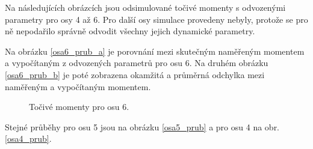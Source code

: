 Na následujících obrázcích jsou odsimulované točivé momenty s odvozenými parametry pro osy 4 až 6. Pro další osy simulace provedeny nebyly, protože se pro ně nepodařilo správně odvodit všechny jejich dynamické parametry.

Na obrázku \ref{osa6_prub_a} je porovnání mezi skutečným naměřeným momentem a vypočítaným z odvozených parametrů pro osu 6. Na druhém obrázku \ref{osa6_prub_b} je poté zobrazena okamžitá a průměrná odchylka mezi naměřeným a vypočítaným momentem. 

\begin{figure}[!h]
  \centering
  \hfill
  \caption{Točivé momenty pro osu 6.}
  \label{osa6_prub}
\end{figure}

Stejné průběhy pro osu 5 jsou na obrázku \ref{osa5_prub} a pro osu 4 na obr. \ref{osa4_prub}.

